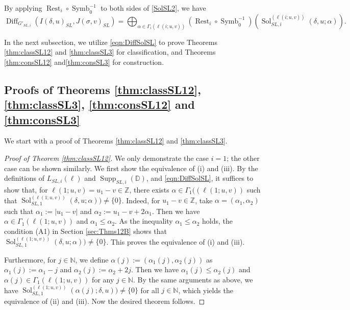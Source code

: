 \documentclass[a4paper,11pt,reqno]{amsart}
\newcommand{\DD}{\mathbb{D}}
\newcommand{\0}{{\bf 0}}
\newcommand{\N}{\mathbb{N}}
\newcommand{\Z}{\mathbb{Z}}
\newcommand{\1}{{\bf 1}}
\DeclareMathOperator{\Supp}{Supp}
\DeclareMathOperator{\Diff}{Diff}
\DeclareMathOperator{\Sol}{Sol}
\DeclareMathOperator{\Symb}{Symb}
\DeclareMathOperator{\Rest}{Rest}
\theoremstyle{plain}
\theoremstyle{definition}
\numberwithin{equation}{section}
\theoremstyle{definition}
\begin{document}
By applying $\Rest_i \circ \Symb_0^{-1}$ to both sides of \eqref{SolSL2},
we have 
\begin{equation}\label{eqn:DiffSolSL}
\Diff_{G'_{SL,i}}(I(\delta,u)_{SL}, J(\sigma,v)_{SL})
=\bigoplus_{\alpha\in\Gamma_i(\ell(i;u,v))}
(\Rest_i \circ \Symb_0^{-1})(\Sol_{SL,i}^{(\ell(i;u,v))}(\delta, u;\alpha)).
\end{equation}

In the next subsection, we utilize \eqref{eqn:DiffSolSL} to prove 
Theorems \ref{thm:classSL12} and \ref{thm:classSL3} for classification, 
and Theorems \ref{thm:consSL12} and\ref{thm:consSL3} for construction.

\subsection{Proofs of Theorems  
\texorpdfstring{\ref{thm:classSL12}}{11.6}, 
\texorpdfstring{\ref{thm:classSL3}}{11.7},
\texorpdfstring{\ref{thm:consSL12}}{11.17} 
and
\texorpdfstring{\ref{thm:consSL3}}{10.18}}\label{sec:ProofSL}

We start with a proof of Theorems \ref{thm:classSL12} and \ref{thm:classSL3}.

\begin{proof}[Proof of Theorem \ref{thm:classSL12}]
We only demonstrate the case $i=1$; the other case can be shown similarly.
We first show the equivalence of (i) and (iii).
By the definitions of $L_{SL,i}(\ell)$ and $\Supp_{SL,i}(\DD)$, 
and \eqref{eqn:DiffSolSL}, it suffices to show that,
for $\ell(1;u,v)=u_1-v \in \Z$,
there exists $\alpha \in \Gamma_1((\ell(1;u,v))$ such that
$\Sol_{SL,1}^{(\ell(1;u,v))}(\delta, u;\alpha)) \neq \{0\}$.
Indeed, for  $u_1-v \in \Z$, 
take $\alpha=(\alpha_1, \alpha_2)$ such that
$\alpha_1 :=|u_1-v|$ and 
$\alpha_2:=u_1-v+2\alpha_1$. 
Then we have
$\alpha \in \Gamma_1(\ell(1;u,v))$
and $\alpha_1 \leq \alpha_2$.
As the inequality $\alpha_1 \leq \alpha_2$ holds, 
the condition (A1) in Section \ref{sec:Thms12B} shows that 
$\Sol_{SL,1}^{(\ell(1;u,v))}(\delta, u;\alpha)) \neq \{0\}$.
This proves the equivalence of (i) and (iii).

Furthermore, for $j\in \N$, we define $\alpha(j):=(\alpha_1(j), \alpha_2(j))$
as $\alpha_1(j):=\alpha_1-j$ and $\alpha_2(j):=\alpha_2+2j$.
Then we have
$\alpha_1(j) \leq \alpha_2(j)$ and 
$\alpha(j) \in \Gamma_1(\ell(1;u,v))$ for any $j \in \N$.
By the same arguments as above, we have
$\Sol_{SL,1}^{(\ell(1;u,v))}(\alpha(j); \delta, u)) \neq \{0\}$
for all $j \in \N$, which yields the equivalence of (ii) and (iii).
Now the desired theorem follows.
\end{proof}
\end{document}
